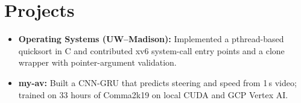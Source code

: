 \documentclass[11pt, letterpaper]{article}
\begin{document}
\section{Projects}
\begin{itemize}
  \item \textbf{Operating Systems (UW--Madison):} Implemented a pthread-based quicksort in C and contributed xv6 system-call entry points and a clone wrapper with pointer-argument validation.
  \item \textbf{my-av:} Built a CNN-GRU that predicts steering and speed from 1\,s video; trained on 33 hours of Comma2k19 on local CUDA and GCP Vertex AI.
\end{itemize}
\end{document}
